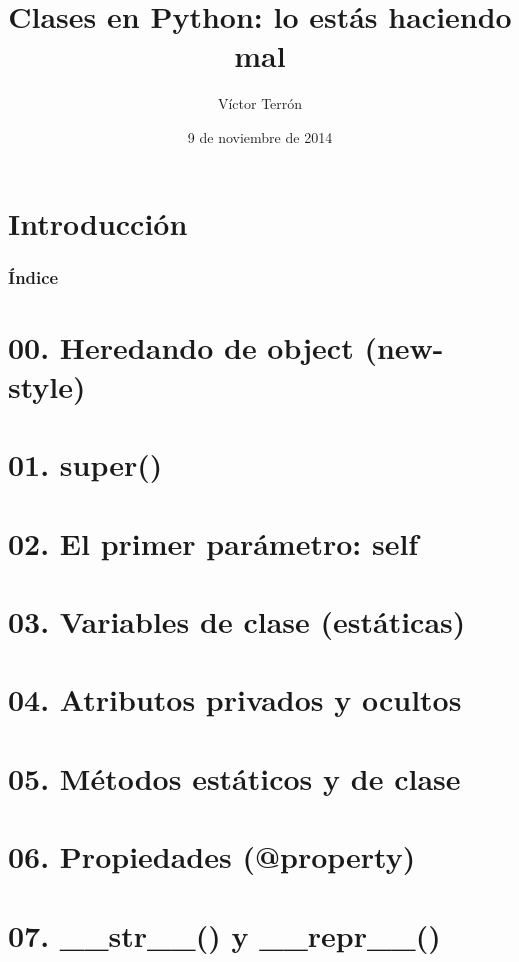 \documentclass[14pt]{beamer}
\title{Clases en Python: lo estás haciendo mal}
\author{Víctor Terrón}
\date{9 de noviembre de 2014}
\institute{IAA-CSIC}
\newcommand{\punto}[1]{}
\begin{document}
\section{Introducción}



\begin{frame}
  \frametitle{Índice}
  \tableofcontents
\end{frame}


\section{00. Heredando de object (new-style)}
\punto{00}

\section{01. super()}
\punto{01}

\section{02. El primer parámetro: self}
\punto{02}

\section{03. Variables de clase (estáticas)}
\punto{03}

\section{04. Atributos privados y ocultos}
\punto{04}

\section{05. Métodos estáticos y de clase}
\punto{05}

\section{06. Propiedades (@property)}
\punto{06}

\section{07. \_\_str\_\_() y \_\_repr\_\_()}
\punto{07}
\end{document}
